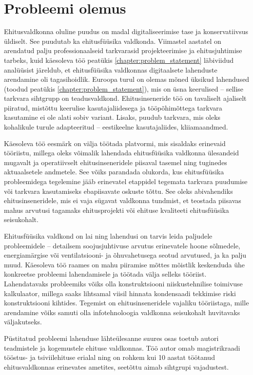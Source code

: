 \section{Probleemi olemus}
\label{chapters:problem_statement}
Ehitusvaldkonna oluline puudus on madal digitaliseerimise tase \cite{digitalization_index} ja konservatiivsus üldiselt. See puudutab ka ehitusfüüsika valdkonda. 
Viimastel aastatel on  arendatud palju professionaalseid tarkvarasid projekteerimise ja ehitusjuhtimise tarbeks, kuid  käesoleva töö 
peatükis \ref{chapter:problem_statement} läbiviidud analüüsist järeldub, et ehitusfüüsika valdkonnas digitaalsete lahenduste arendamine oli tagasihoidlik. 
Euroopa turul on olemas mõned üksikud lahendused (toodud peatükis \ref{chapter:problem_statement}), mis on üsna keerulised -- sellise tarkvara sihtgrupp on teadusvaldkond.
Ehitusinseneride töö on tavaliselt ajaliselt piiratud, mistõttu keerulise kasutajaliidesega ja tööpõhimõttega tarkvara kasutamine ei ole alati sobiv variant. 
Lisaks, puudub tarkvara, mis oleks kohalikule turule adapteeritud -- eestikeelne kasutajaliides, kliiamaandmed.

Käesoleva töö eesmärk on välja töötada platvormi, mis sisaldaks erinevaid tööriistu, millega oleks võimalik lahendada ehitusfüüsika valdkonna ülesandeid mugavalt 
ja operatiivselt ehitusinseneridele piisaval tasemel ning tuginedes aktuaalsetele andmetele. See võiks parandada olukorda, kus ehitusfüüsika probleemidega tegelemine
jääb erinevatel etappidel tegemata tarkvara puudumise või tarkvara kasutamiseks ebapiisavate oskuste tõttu. 
See oleks abivahendiks ehitusinseneridele, mis ei vaja sügavat valdkonna tundmist, et teostada piisavas mahus arvutusi 
tagamaks ehitusprojekti või ehituse kvaliteeti ehitusfüüsika seisukohalt. 

Ehitusfüüsika valdkond on lai ning lahendusi on tarvis leida paljudele probleemidele -- detailsem soojusjuhtivuse arvutus erinevatele hoone sõlmedele,
energiamärgise või ventilatsiooni- ja õhuvahetusega seotud arvutused, ja ka palju muud. Käesoleva töö raames on mahu piiramise mõttes mõistlik
keskenduda ühe konkreetse probleemi lahendamisele ja töötada välja selleks tööriist. Lahendatavaks probleemiks võiks olla konstruktsiooni
niiskustehnilise toimivuse kalkulaator, millega saaks lihtsamal viisil hinnata kondensaadi tekkimise riski konstruktsiooni kihtides.
Tegemist on ehitusinseneridele vajaliku tööriistaga, mille arendamine võiks samuti olla infotehnoloogia valdkonna seisukohalt
huvitavaks väljakutseks.

Püstitatud probleemi lahenduse lähteülesanne suures osas toetub autori teadmistele ja kogemustele ehituse valdkonnas. Töö autor omab magistrikraadi
tööstus- ja tsiviilehituse erialal ning on rohkem kui 10 aastat töötanud ehitusvaldkonnas erinevates ametites, seetõttu aimab sihtgrupi vajadustest. 